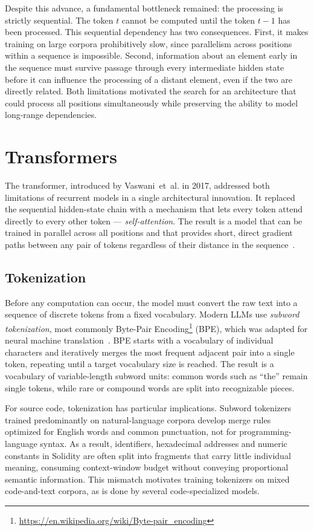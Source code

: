 Despite this advance, a fundamental bottleneck remained: the processing is strictly sequential. The token $t$ cannot be computed until the token $t{-}1$ has been processed. This sequential dependency has two consequences. First, it makes training on large corpora prohibitively slow, since parallelism across positions within a sequence is impossible. Second, information about an element early in the sequence must survive passage through every intermediate hidden state before it can influence the processing of a distant element, even if the two are directly related. Both limitations motivated the search for an architecture that could process all positions simultaneously while preserving the ability to model long-range dependencies.

\section{Transformers}
\label{sec:transformers}

The transformer, introduced by Vaswani~et~al. in 2017, addressed both limitations of recurrent models in a single architectural innovation. It replaced the sequential hidden-state chain with a mechanism that lets every token attend directly to every other token --- \emph{self-attention}. The result is a model that can be trained in parallel across all positions and that provides short, direct gradient paths between any pair of tokens regardless of their distance in the sequence~\cite{vaswani2023attentionneed}.

\subsection{Tokenization}
\label{subsec:tokenization}

Before any computation can occur, the model must convert the raw text into a sequence of discrete tokens from a fixed vocabulary. Modern LLMs use \emph{subword tokenization}, most commonly Byte-Pair Encoding\footnote{\url{https://en.wikipedia.org/wiki/Byte-pair_encoding}} (BPE), which was adapted for neural machine translation~\cite{sennrich2016bpe}. BPE starts with a vocabulary of individual characters and iteratively merges the most frequent adjacent pair into a single token, repeating until a target vocabulary size is reached. The result is a vocabulary of variable-length subword units: common words such as ``the'' remain single tokens, while rare or compound words are split into recognizable pieces.

For source code, tokenization has particular implications. Subword tokenizers trained predominantly on natural-language corpora develop merge rules optimized for English words and common punctuation, not for programming-language syntax. As a result, identifiers, hexadecimal addresses and numeric constants in Solidity are often split into fragments that carry little individual meaning, consuming context-window budget without conveying proportional semantic information. This mismatch motivates training tokenizers on mixed code-and-text corpora, as is done by several code-specialized models.

